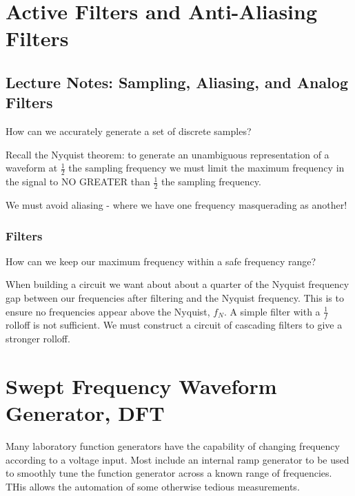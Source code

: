\chapter{Active Filters and Anti-Aliasing Filters}

\section{Lecture Notes: Sampling, Aliasing, and Analog Filters}

\begin{qst}
    How can we accurately generate a set of discrete samples?
\end{qst}
Recall the Nyquist theorem: to generate an unambiguous representation of a waveform at $\frac{1}{2}$ the sampling frequency we must limit the maximum frequency in the signal to NO GREATER than $\frac{1}{2}$ the sampling frequency. 

We must avoid aliasing - where we have one frequency masquerading as another! 

\subsection{Filters}

\begin{qst}
    How can we keep our maximum frequency within a safe frequency range?
\end{qst}

When building a circuit we want about about a quarter of the Nyquist frequency gap between our frequencies after filtering and the Nyquist frequency. This is to ensure no frequencies appear above the Nyquist, $f_N$. A simple filter with a $\frac{1}{f}$ rolloff is not sufficient. We must construct a circuit of cascading filters to give a stronger rolloff.





\chapter{Swept Frequency Waveform Generator, DFT}


Many laboratory function generators have the capability of changing frequency according to a voltage input. Most include an internal ramp generator to be used to smoothly tune the function generator across a known range of frequencies. THis allows the automation of some otherwise tedious measurements. 

